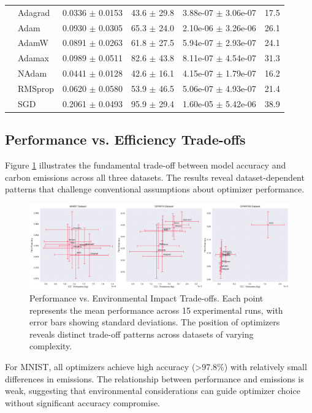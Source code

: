 \documentclass[conference]{IEEEtran}
\begin{document}
\begin{table}[htbp]
\begin{tabular}{@{}llcccr@{}}
& Adagrad & 0.0336 $\pm$ 0.0153 & 43.6 $\pm$ 29.8 & 3.88e-07 $\pm$ 3.06e-07 & 17.5 \\
& Adam & 0.0930 $\pm$ 0.0305 & 65.3 $\pm$ 24.0 & 2.10e-06 $\pm$ 3.26e-06 & 26.1 \\
& AdamW & 0.0891 $\pm$ 0.0263 & 61.8 $\pm$ 27.5 & 5.94e-07 $\pm$ 2.93e-07 & 24.1 \\
& Adamax & 0.0989 $\pm$ 0.0511 & 82.6 $\pm$ 43.8 & 8.11e-07 $\pm$ 4.54e-07 & 31.3 \\
& NAdam & 0.0441 $\pm$ 0.0128 & 42.6 $\pm$ 16.1 & 4.15e-07 $\pm$ 1.79e-07 & 16.2 \\
& RMSprop & 0.0620 $\pm$ 0.0580 & 53.9 $\pm$ 46.5 & 5.06e-07 $\pm$ 4.93e-07 & 21.4 \\
& SGD & 0.2061 $\pm$ 0.0493 & 95.9 $\pm$ 29.4 & 1.60e-05 $\pm$ 5.42e-06 & 38.9 \\
\bottomrule
\end{tabular}
\end{table}

\subsection{Performance vs. Efficiency Trade-offs}

Figure \ref{fig:accuracy_vs_emissions} illustrates the fundamental trade-off between model accuracy and carbon emissions across all three datasets. The results reveal dataset-dependent patterns that challenge conventional assumptions about optimizer performance.

\begin{figure}[htbp]
\centering
\includegraphics[width=\textwidth]{accuracy_vs_emissions.png}
\caption{Performance vs. Environmental Impact Trade-offs. Each point represents the mean performance across 15 experimental runs, with error bars showing standard deviations. The position of optimizers reveals distinct trade-off patterns across datasets of varying complexity.}
\label{fig:accuracy_vs_emissions}
\end{figure}

For MNIST, all optimizers achieve high accuracy (>97.8\%) with relatively small differences in emissions. The relationship between performance and emissions is weak, suggesting that environmental considerations can guide optimizer choice without significant accuracy compromise.
\end{document}
